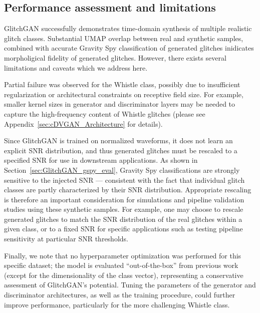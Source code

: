 \documentclass[reprint,nofootinbib,amsmath,amssymb,aps,floatfix]{revtex4-2}
\begin{document}
\subsection{Performance assessment and limitations}

GlitchGAN successfully demonstrates time-domain synthesis of multiple realistic glitch classes.
Substantial UMAP overlap between real and synthetic samples, combined with accurate Gravity Spy classification of generated glitches inidicates morpholigical fidelity of generated glitches.
However, there exists several limitations and caveats which we address here.

Partial failure was observed for the Whistle class, possibly due to insufficient regularization or architectural constraints on receptive field size. 
For example, smaller kernel sizes in generator and discriminator  layers may be needed to capture the high-frequency content of Whistle glitches (please see Appendix~\ref{sec:cDVGAN_Architecture} for details).

Since GlitchGAN is trained on normalized waveforms, it does not learn an explicit SNR distribution, and thus generated glitches must be rescaled to a specified SNR for use in downstream applications. 
As shown in Section~\ref{sec:GlitchGAN_gspy_eval}, Gravity Spy classifications are strongly sensitive to the injected SNR --- consistent with the fact that individual glitch classes are partly characterized by their SNR distribution.
Appropriate rescaling is therefore an important consideration for simulations and pipeline validation studies using these synthetic samples.
For example, one may choose to rescale generated glitches to match the SNR distribution of the real glitches within a given class, or to a fixed SNR for specific applications such as testing pipeline sensitivity at particular SNR thresholds.

Finally, we note that no hyperparameter optimization was performed for this specific dataset; the model is evaluated ``out-of-the-box'' from previous work (except for the dimensionality of the class vector), representing a conservative assessment of GlitchGAN's potential.
Tuning the parameters of the generator and discriminator architectures, as well as the training procedure, could further improve performance, particularly for the more challenging Whistle class.


\end{document}
